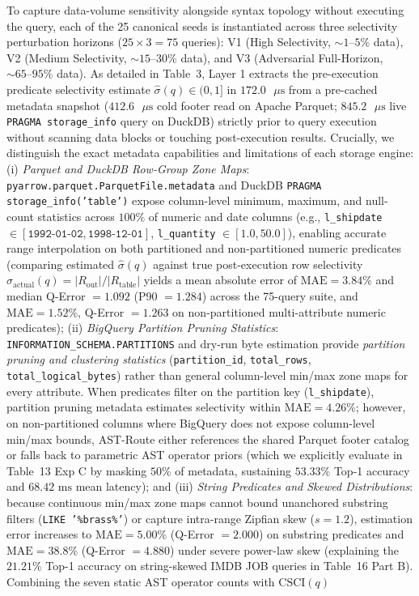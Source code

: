 \documentclass[10pt,a4paper]{article}
\begin{document}
To capture data-volume sensitivity alongside syntax topology without executing the query, each of the 25 canonical seeds is instantiated across three selectivity perturbation horizons ($25 \times 3 = 75$ queries): V1 (High Selectivity, $\sim 1\text{--}5\%$ data), V2 (Medium Selectivity, $\sim 15\text{--}30\%$ data), and V3 (Adversarial Full-Horizon, $\sim 65\text{--}95\%$ data). As detailed in Table~3, Layer 1 extracts the pre-execution predicate selectivity estimate $\hat{\sigma}(q) \in (0, 1]$ in $172.0\text{ }\mu\text{s}$ from a pre-cached metadata snapshot ($412.6\text{ }\mu\text{s}$ cold footer read on Apache Parquet; $845.2\text{ }\mu\text{s}$ live \texttt{PRAGMA storage\_\allowbreak{}info} query on DuckDB) strictly prior to query execution without scanning data blocks or touching post-execution results. Crucially, we distinguish the exact metadata capabilities and limitations of each storage engine: (i) \emph{Parquet and DuckDB Row-Group Zone Maps}: \texttt{pyarrow.parquet.ParquetFile.metadata} and DuckDB \texttt{PRAGMA storage\_\allowbreak{}info('table')} expose column-level minimum, maximum, and null-count statistics across $100\%$ of numeric and date columns (e.g., \texttt{l\_\allowbreak{}shipdate} $\in [\texttt{1992-01-02}, \texttt{1998-12-01}]$, \texttt{l\_\allowbreak{}quantity} $\in [1.0, 50.0]$), enabling accurate range interpolation on both partitioned and non-partitioned numeric predicates (comparing estimated $\hat{\sigma}(q)$ against true post-execution row selectivity $\sigma_{\text{actual}}(q) = |R_{\text{out}}|/|R_{\text{table}}|$ yields a mean absolute error of $\text{MAE}=3.84\%$ and median Q-Error $=1.092$ (P90 $= 1.284$) across the 75-query suite, and $\text{MAE}=1.52\%$, Q-Error $=1.263$ on non-partitioned multi-attribute numeric predicates); (ii) \emph{BigQuery Partition Pruning Statistics}: \texttt{INFORMATION\_\allowbreak{}SCHEMA.}\newline\texttt{PARTITIONS} and dry-run byte estimation provide \emph{partition pruning and clustering statistics} (\texttt{partition\_\allowbreak{}id}, \texttt{total\_\allowbreak{}rows}, \texttt{total\_\allowbreak{}logical\_\allowbreak{}bytes}) rather than general column-level min/max zone maps for every attribute. When predicates filter on the partition key (\texttt{l\_\allowbreak{}shipdate}), partition pruning metadata estimates selectivity within $\text{MAE}=4.26\%$; however, on non-partitioned columns where BigQuery does not expose column-level min/max bounds, AST-Route either references the shared Parquet footer catalog or falls back to parametric AST operator priors (which we explicitly evaluate in Table~13 Exp C by masking $50\%$ of metadata, sustaining $53.33\%$ Top-1 accuracy and $68.42\text{ ms}$ mean latency); and (iii) \emph{String Predicates and Skewed Distributions}: because continuous min/max zone maps cannot bound unanchored substring filters (\texttt{LIKE '\%brass\%'}) or capture intra-range Zipfian skew ($s=1.2$), estimation error increases to $\text{MAE}=5.00\%$ (Q-Error $=2.000$) on substring predicates and $\text{MAE}=38.8\%$ (Q-Error $=4.880$) under severe power-law skew (explaining the $21.21\%$ Top-1 accuracy on string-skewed IMDB JOB queries in Table~16 Part B). Combining the seven static AST operator counts with $\text{CSCI}(q)$ 
\end{document}
